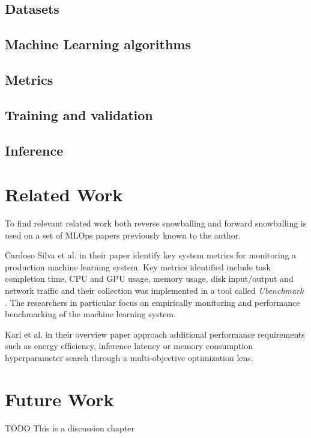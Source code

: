 \subsection{Datasets}
\subsection{Machine Learning algorithms}
\subsection{Metrics}
\subsection{Training and validation}
\subsection{Inference}


\section{Related Work}

To find relevant related work both reverse snowballing and forward snowballing is used on a set of MLOps papers previously known to the author.

Cardoso Silva et al. \parencite*{cardososilvaBenchmarkingMachineLearning2020} in their paper identify key system metrics for monitoring a production machine learning system. Key metrics identified include task completion time, CPU and GPU usage, memory usage, disk input/output and network traffic and their collection was implemented in a tool called \emph{Ubenchmark} \parencite{cardososilvaBenchmarkingMachineLearning2020}. The researchers in particular focus on empirically monitoring and performance benchmarking of the machine learning system.

Karl et al. \parencite*{karlMultiObjectiveHyperparameterOptimization2023} in their overview paper approach additional performance requirements such as energy efficiency, inference latency or memory consumption hyperparameter search through a multi-objective optimization lens. 

\section{Future Work}
TODO This is a discussion chapter